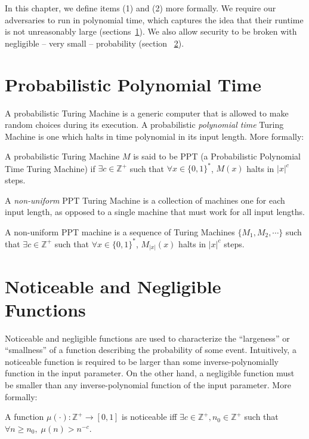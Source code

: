 \documentclass[12pt]{tufte-book}
\begin{document}
In this chapter, we define items (1) and (2) more formally. We require our adversaries to run in polynomial time, which captures the idea that their runtime is not unreasonably large (sections~\ref{ssec:ppt}). We also allow security to be broken with negligible -- very small -- probability (section ~\ref{ssec:nnf}). 


\section{Probabilistic Polynomial Time}
\label{ssec:ppt}
A probabilistic Turing Machine is a generic computer that is allowed to make random choices during its execution. A probabilistic \textit{polynomial time} Turing Machine is one which halts in time polynomial in its input length. More formally:

\begin{definition}
A probabilistic Turing Machine $M$ is said to be PPT (a Probabilistic Polynomial Time Turing Machine) if $\exists c \in \mathbb{Z}^+$ such that $\forall x \in\{0,1\}^*$, $M(x)$ halts in $|x|^c$ steps.
\end{definition}

A {\em non-uniform} PPT Turing Machine is a collection of machines one for each input length, as opposed to a single machine that must work for all input lengths.

\begin{definition}
A non-uniform PPT machine is a sequence of Turing Machines $\{ M_1, M_2, \cdots \}$ such that $\exists c \in \mathbb{Z}^+$ such that $\forall x \in\{0,1\}^*$, $M_{|x|}(x)$ halts in $|x|^c$ steps.
\end{definition}



\section{Noticeable and Negligible Functions}
\label{ssec:nnf}
Noticeable and negligible functions are used to characterize the ``largeness'' or ``smallness'' of a function describing the probability of some event.  Intuitively, a noticeable function is required to be larger than some inverse-polynomially function in the input parameter. On the other hand, a negligible function must be smaller than any inverse-polynomial function of the input parameter. More formally:


\begin{definition}
A function $\mu(\cdot): \mathbb{Z}^+ \rightarrow [0,1]$ is noticeable iff $\exists c \in \mathbb{Z}^+, n_0 \in \mathbb{Z}^+$ such that $\forall n \geq n_0 , \; \mu(n) > n^{-c}$.
\end{definition}
\end{document}
